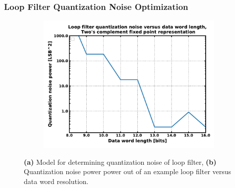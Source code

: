\subsubsection{Loop Filter Quantization Noise Optimization}\label{lf_quant_noise_opt}


	\begin{figure}[htb!]
	    \centering
	    \begin{subfigure}{0.5\textwidth}
	        \centering
	        \center
	        \caption{ }
	        \label{fig:lf_quant_noise_model}
	    \end{subfigure}%
	    \begin{subfigure}{0.5\textwidth}
	        \centering
	       \center\includegraphics[width=1\textwidth, angle=0]{figs/lf_quant_noise.pdf}
	        \caption{ }
	        \label{fig:lf_quant_mse}
	    \end{subfigure}
	    \label{fig:lf_quant_noise_opt}
	    \caption{\textbf{(a)} Model for determining quantization noise of loop filter, \textbf{(b)} Quantization noise power power out of an example loop filter versus data word resolution.}
	\end{figure}






